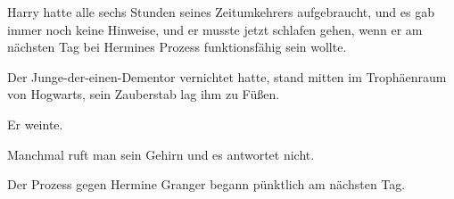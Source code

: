 Harry hatte alle sechs Stunden seines Zeitumkehrers aufgebraucht, und es gab immer noch keine Hinweise, und er musste jetzt schlafen gehen, wenn er am nächsten Tag bei Hermines Prozess funktionsfähig sein wollte.

Der Junge-der-einen-Dementor vernichtet hatte, stand mitten im Trophäenraum von Hogwarts, sein Zauberstab lag ihm zu Füßen.

Er weinte.

Manchmal ruft man sein Gehirn und es antwortet nicht.

Der Prozess gegen Hermine Granger begann pünktlich am nächsten Tag.

